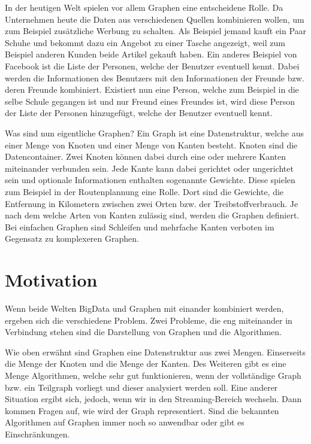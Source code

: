 In der heutigen Welt spielen vor allem Graphen eine entscheidene Rolle. Da 
Unternehmen heute die Daten aus verschiedenen Quellen kombinieren wollen, um zum
Beispiel zusätzliche Werbung zu schalten. Als Beispiel jemand kauft ein Paar
Schuhe und bekommt dazu ein Angebot zu einer Tasche angezeigt, weil zum
Beispiel anderen Kunden beide Artikel gekauft haben. Ein anderes Beispiel von
Facebook ist die Liste der Personen, welche der Benutzer eventuell kennt.
Dabei werden die Informationen des Benutzers mit den Informationen der Freunde
bzw. deren Freunde kombiniert. Existiert nun eine Person, welche zum Beispiel
in die selbe Schule gegangen ist und nur Freund eines Freundes ist, wird diese
Person der Liste der Personen hinzugefügt, welche der Benutzer eventuell kennt.

Was sind nun eigentliche Graphen? Ein Graph ist eine Datenstruktur, welche aus
einer Menge von Knoten und einer Menge von Kanten besteht. Knoten sind die
Datencontainer. Zwei Knoten können dabei durch eine oder mehrere Kanten miteinander
verbunden sein. Jede Kante kann dabei gerichtet oder ungerichtet sein und
optionale Informationen enthalten sogenannte Gewichte. Diese spielen zum Beispiel
in der Routenplannung eine Rolle. Dort sind die Gewichte, die Entfernung in
Kilometern zwischen zwei Orten bzw. der Treibstoffverbrauch. Je nach dem welche
Arten von Kanten zulässig sind, werden die Graphen definiert. Bei einfachen
Graphen sind Schleifen und mehrfache Kanten verboten im Gegensatz zu komplexeren
Graphen.

\section{Motivation}
Wenn beide Welten \gls{BigData} und Graphen mit einander kombiniert werden,
ergeben sich die verschiedene Problem. Zwei Probleme, die eng miteinander in
Verbindung stehen sind die Darstellung von Graphen und die Algorithmen.

Wie oben erwähnt sind Graphen eine Datenstruktur aus zwei Mengen. Einserseits
die Menge der Knoten und die Menge der Kanten. Des Weiteren gibt es eine Menge
Algorithmen, welche sehr gut funktionieren, wenn der vollständige Graph bzw. ein
Teilgraph vorliegt und dieser analysiert werden soll. Eine anderer Situation
ergibt sich, jedoch, wenn wir in den Streaming-Bereich wechseln. Dann kommen
Fragen auf, wie wird der Graph representiert. Sind die bekannten Algorithmen
auf Graphen immer noch so anwendbar oder gibt es Einschränkungen.


